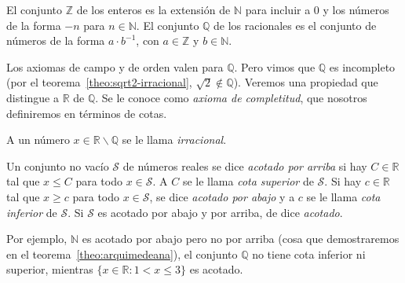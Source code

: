   El conjunto \(\mathbb{Z}\) de los enteros
  es la extensión de \(\mathbb{N}\)
  para incluir a \(0\)
  y los números de la forma \(-n\) para \(n \in \mathbb{N}\).
  El conjunto \(\mathbb{Q}\) de los racionales
  es el conjunto de números de la forma \(a \cdot b^{-1}\),
  con \(a \in \mathbb{Z}\) y \(b \in \mathbb{N}\).

  Los axiomas de campo y de orden valen para \(\mathbb{Q}\).%
  Pero vimos que \(\mathbb{Q}\) es incompleto
  (por el teorema~\ref{theo:sqrt2-irracional},
   \(\sqrt{2} \notin \mathbb{Q}\)).
  Veremos una propiedad que distingue a \(\mathbb{R}\) de \(\mathbb{Q}\).
  Se le conoce como \emph{axioma de completitud},%
  que nosotros definiremos en términos de cotas.
  \begin{definition}
    A un número \(x \in \mathbb{R} \smallsetminus \mathbb{Q}\)
    se le llama \emph{irracional}.%
  \end{definition}

  \begin{definition}
    Un conjunto no vacío \(\mathcal{S}\) de números reales
    se dice \emph{acotado por arriba} si hay \(C \in \mathbb{R}\)
    tal que \(x \le C\) para todo \(x \in \mathcal{S}\).
    A \(C\) se le llama \emph{cota superior} de \(\mathcal{S}\).%
    Si hay \(c \in \mathbb{R}\)
    tal que \(x \ge c\) para todo \(x \in \mathcal{S}\),
    se dice \emph{acotado por abajo}
    y a \(c\) se le llama \emph{cota inferior} de \(\mathcal{S}\).%
    Si \(\mathcal{S}\) es acotado por abajo y por arriba,
    de dice \emph{acotado}.%
  \end{definition}
  Por ejemplo,
  \(\mathbb{N}\) es acotado por abajo pero no por arriba
  (cosa que demostraremos en el teorema~\ref{theo:arquimedeana}),
  el conjunto \(\mathbb{Q}\) no tiene cota inferior ni superior,
  mientras \(\{x \in \mathbb{R} \colon 1 < x \le 3\}\) es acotado.

